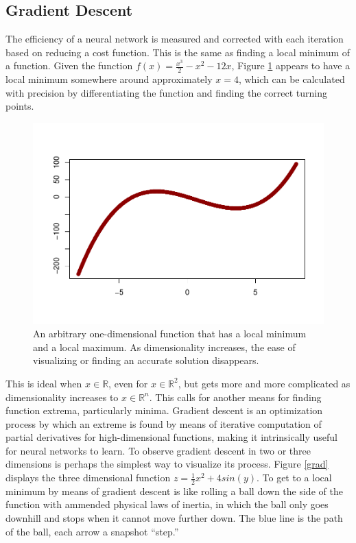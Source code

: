 
\hypertarget{gradient-descent}{%
\subsection{Gradient Descent}\label{gradient-descent}}

The efficiency of a neural network is measured and corrected with each
iteration based on reducing a cost function. This is the same as finding
a local minimum of a function.  Given the function \(f(x) = \frac{x^3}{2} - x^2 - 12x\), Figure \ref{red} appears to have a local minimum somewhere around approximately $x = 4$, which can be calculated with precision by differentiating the function and finding the correct turning points.

\begin{figure}[H]
    \centering
    \vspace{-40pt}
    \includegraphics[width = .7\textwidth]{Figures/grad_desc_2D-1.pdf}
    \vspace{-40pt}
    \caption{\footnotesize An arbitrary one-dimensional function that has a local minimum and a local maximum.  As dimensionality increases, the ease of visualizing or finding an accurate solution disappears.}
    \label{red}
\end{figure}

This is ideal when \(x \in \mathbb{R}\), even for
\(x \in \mathbb{R}^2\), but gets more  and more complicated as
dimensionality increases to \(x \in \mathbb{R}^n\). This calls for
another means for finding function extrema, particularly minima.
Gradient descent is an optimization process by which an extreme is found by
means of iterative computation of partial derivatives for high-dimensional functions, making it intrinsically useful for neural networks to learn.  To observe gradient descent in two or three dimensions is perhaps the simplest way to visualize its process.  Figure \ref{grad} displays the three dimensional function $z = \frac{1}{2} x^2 + 4 sin(y)$.  To get to a local minimum by means of gradient descent is like rolling a ball down the side of the function with ammended physical laws of inertia, in which the ball only goes downhill and stops when it cannot move further down.  The blue line is the path of the ball, each arrow a snapshot ``step.''


